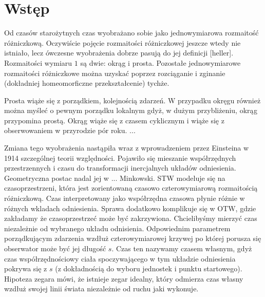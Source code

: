 \section{Wstęp}
Od czasów starożytnych czas wyobrażano sobie jako jednowymiarowa 
rozmaitość różniczkową. 
Oczywiście pojęcie rozmaitości różniczkowej jeszcze wtedy nie istniało, 
lecz ówczesne wyobrażenia dobrze pasują do jej definicji [heller]. 
Rozmaitości wymiaru $1$ są dwie: okrąg i prosta. 
Pozostałe jednowymiarowe rozmaitości różniczkowe można uzyskać 
poprzez rozciąganie i zginanie (dokładniej homeomorficzne przekształcenie) 
tychże.  

Prosta wiąże się z porządkiem, kolejnością zdarzeń. 
W przypadku okręgu również można myśleć o pewnym porządku lokalnym gdyż, 
w dużym przybliżeniu, okrąg przypomina prostą. 
Okrąg wiąże się z czasem cyklicznym i wiąże się z 
obserwowaniem w przyrodzie pór roku.
...

Zmiana tego wyobrażenia nastąpiła wraz z wprowadzeniem przez 
Einsteina w 1914 szczególnej teorii względności. 
Pojawiło się mieszanie współrzędnych przestrzennych i czasu do transformacji 
inercjalnych układów odniesienia. 
Geometryczna postac nadal jej w ... Minkowski. 
STW modeluje się na czasoprzestrzeni, która jest  
zorientowaną czasowo czterowymiarową 
rozmaitością różniczkową. 
Czas interpretowany jako współrzędna czasowa 
płynie różnie w różnych wkladach odniesienia. 
Sprawa dodatkowo komplikuje się w OTW, gdzie zakładamy 
że czasoprzestrzeć może być zakrzywiona.
Chcielibyśmy mierzyć czas niezależnie od wybranego układu odnisienia. 
Odpowiednim parametrem porządkującym zdarzenia wzdłuż 
czterowymiarowej krzywej 
po której porusza się obserwator może być jej długość $s$. 
Czas ten nazywamy czasem własnym, gdyż czas współrzędnościowy 
ciała spoczywającego w 
tym układzie odniesienia pokrywa się z $s$ (z dokładnością do 
wyboru jednostek i punktu startowego). Hipoteza zegara
mówi, że istnieje zegar idealny, który odmierza czas własny 
wzdłuż swojej linii świata niezależnie od ruchu jaki wykonuje.

